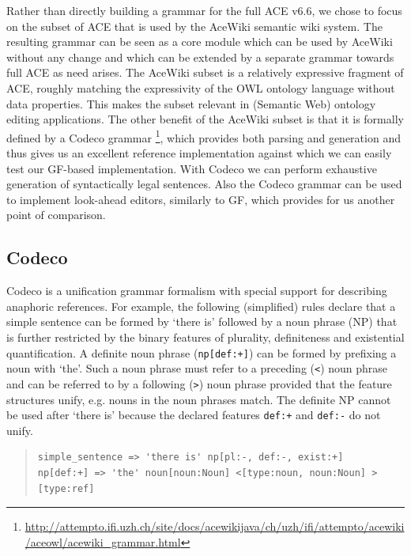 \documentclass[a4paper]{article}
\begin{document}
Rather than directly building a grammar for the
full ACE v6.6\cite{ACE_6.6_Construction_Rules}, we chose to focus
on the subset of ACE that is used by the AceWiki semantic wiki system. The
resulting grammar can be seen as a core module which can be used by AceWiki
without any change and which can be extended by a separate grammar
towards full ACE as need arises. The AceWiki subset is a relatively expressive
fragment of ACE, roughly matching the expressivity of the OWL ontology
language
\cite{OWL_2_Web_Ontology_Language_Document_Overview}
without data properties.
This makes the subset relevant in (Semantic Web) ontology editing applications.
The other benefit of the AceWiki subset is that it is formally defined by a
Codeco grammar \cite{kuhn:cnl2010_revised}
\footnote{\url{http://attempto.ifi.uzh.ch/site/docs/acewikijava/ch/uzh/ifi/attempto/acewiki/aceowl/acewiki_grammar.html}},
which provides both parsing and generation and thus gives us an excellent
reference implementation against which we can easily test our GF-based
implementation.
With Codeco we can perform exhaustive generation of syntactically legal
sentences. Also the Codeco grammar can be used to implement look-ahead
editors, similarly to GF, which provides for us another point of comparison.

\subsection{Codeco}

Codeco is a unification grammar formalism with special support for describing
anaphoric references. For example, the following (simplified)
rules declare that a simple
sentence can be formed by `there is' followed by
a noun phrase (NP) that is further restricted by the binary features of
plurality, definiteness and existential quantification.
A definite noun phrase (\verb!np[def:+]!) can be formed by prefixing
a noun with `the'. Such a noun phrase
must refer to a preceding (\verb!<!) noun phrase and can be referred to by a
following (\verb!>!) noun phrase provided that the feature structures
unify, e.g. nouns in the noun phrases match.
The definite NP cannot be used after `there is' because the
declared features \verb!def:+! and \verb!def:-! do not unify.

\small
\begin{quote}
\begin{verbatim}
simple_sentence => 'there is' np[pl:-, def:-, exist:+]
np[def:+] => 'the' noun[noun:Noun] <[type:noun, noun:Noun] >[type:ref]
\end{verbatim}
\end{quote}
\normalsize
\end{document}
